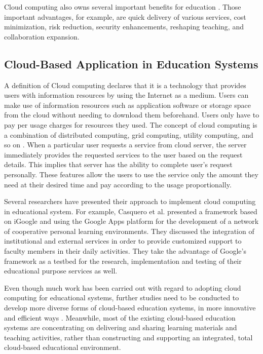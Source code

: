 \documentclass[journal]{vgtc}
\begin{document}
  Cloud computing also owns several important benefits for education \cite{Bouyer2014}. Those important advantages, for example, are quick delivery of various services, cost minimization, risk reduction, security enhancements, reshaping teaching, and collaboration expansion.

  \subsection{Cloud-Based Application in Education Systems}
  A definition of Cloud computing declares that it is a technology that provides users with information resources by using the Internet as a medium. Users can make use of information resources such as application software or storage space from the cloud without needing to download them beforehand. Users only have to pay per usage charges for resources they used. The concept of cloud computing is a combination of distributed computing, grid computing, utility computing, and so on \cite{s110807835}. When a particular user requests a service from cloud server, the server immediately provides the requested services to the user based on the  request details. This implies that server has the ability to complete user's request personally. These features allow the users to use the service only the amount they need at their desired time and pay according to the usage proportionally.
  
  Several researchers have presented their approach to implement cloud computing in educational system. For example, Casquero et al. \cite{casquero2008igoogle} presented a framework based on iGoogle and using the Google Apps platform for the development of a network of cooperative personal learning environments. They discussed the integration of institutional and external services in order to provide customized support to faculty members in their daily activities. They take the advantage of Google's framework as a testbed for the research, implementation and testing of their educational purpose services as well.

  Even though much work has been carried out with regard to adopting cloud computing for educational systems, further studies need to be conducted to develop more diverse forms of cloud-based education systems, in more innovative and efficient ways \cite{jeong2013content}. Meanwhile, most of the existing cloud-based education systems are concentrating on delivering and sharing learning materials and teaching activities, rather than constructing and supporting an integrated, total cloud-based educational environment.
\end{document}
